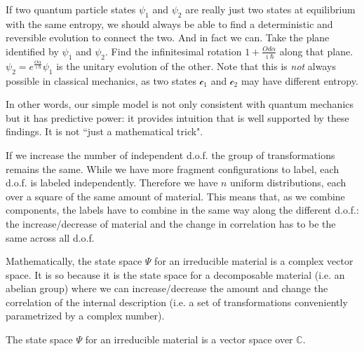 \documentclass[smallextended]{svjour3}
\numberwithin{equation}{section}
\begin{document}
If two quantum particle states $\psi_1$ and $\psi_2$ are really just two states at equilibrium with the same entropy, we should always be able to find a deterministic and reversible evolution to connect the two. And in fact we can. Take the plane identified by $\psi_1$ and $\psi_2$. Find the infinitesimal rotation $1 + \frac{Od\alpha}{\imath\hbar}$ along that plane. $\psi_2 = e^{\frac{O\alpha}{\imath\hbar}} \psi_1$ is the unitary evolution of the other. Note that this is \emph{not} always possible in classical mechanics, as two states $\mathcal{c}_1$ and $\mathcal{c}_2$ may have different entropy.

In other words, our simple model is not only consistent with quantum mechanics but it has predictive power: it provides intuition that is well supported by these findings. It is not ``just a mathematical trick".

If we increase the number of independent d.o.f. the group of transformations remains the same. While we have more fragment configurations to label, each d.o.f. is labeled independently. Therefore we have $n$ uniform distributions, each over a square of the same amount of material. This means that, as we combine components, the labels have to combine in the same way along the different d.o.f.: the increase/decrease of material and the change in correlation has to be the same across all d.o.f.

Mathematically, the state space $\Psi$ for an irreducible material is a complex vector space. It is so because it is the state space for a decomposable material (i.e. an abelian group) where we can increase/decrease the amount and change the correlation of the internal description (i.e. a set of transformations conveniently parametrized by a complex number).

\begin{prop}\label{prop:complex_vector_space}
	The state space $\Psi$ for an irreducible material is a vector space over $\mathbb{C}$.
\end{prop}
\end{document}
